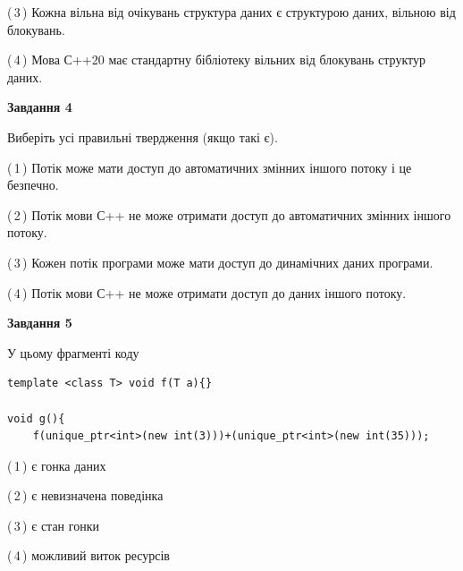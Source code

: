 \documentclass[12pt, ukrainian]{article}
\begin{document}
\begin {large}
{(\,3\,) Кожна вільна від очікувань структура даних є структурою даних, вільною від блокувань.%

(\,4\,) Мова С++20 має стандартну бібліотеку вільних від блокувань структур даних.%



\begin{center}
\textbf{Завдання 4}
\end{center}
Виберіть усі правильні твердження (якщо такі є).\par
\vspace{2mm}

(\,1\,) Потік може мати доступ до автоматичних змінних іншого потоку і це безпечно.%

(\,2\,) Потік мови С++ не може отримати доступ до автоматичних змінних іншого потоку.%

(\,3\,) Кожен потік програми може мати доступ до динамічних даних програми.%

(\,4\,) Потік мови С++ не може отримати доступ до даних іншого потоку.%



\begin{center}
\textbf{Завдання 5}
\end{center}
У цьому фрагменті коду
\begin{verbatim}
template <class T> void f(T a){}

void g(){
    f(unique_ptr<int>(new int(3)))+(unique_ptr<int>(new int(35)));
\end{verbatim}

(\,1\,) є гонка даних%

(\,2\,) є невизначена поведінка%

(\,3\,) є стан гонки%

(\,4\,) можливий виток ресурсів%


}
\end {large}
\end{document}
